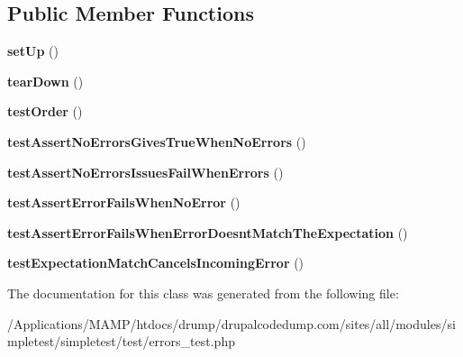 \subsection*{Public Member Functions}
\begin{DoxyCompactItemize}
\item 
\hypertarget{class_test_of_error_queue_a1073dde3733bd1c213b1581d3fb9f7b5}{
{\bfseries setUp} ()}
\label{class_test_of_error_queue_a1073dde3733bd1c213b1581d3fb9f7b5}

\item 
\hypertarget{class_test_of_error_queue_a047b4bffa4431c64edc4797cf8572d31}{
{\bfseries tearDown} ()}
\label{class_test_of_error_queue_a047b4bffa4431c64edc4797cf8572d31}

\item 
\hypertarget{class_test_of_error_queue_a553122da5234bb5e87b1db065303723a}{
{\bfseries testOrder} ()}
\label{class_test_of_error_queue_a553122da5234bb5e87b1db065303723a}

\item 
\hypertarget{class_test_of_error_queue_a516bd676dc9d5a3504d67329d5067984}{
{\bfseries testAssertNoErrorsGivesTrueWhenNoErrors} ()}
\label{class_test_of_error_queue_a516bd676dc9d5a3504d67329d5067984}

\item 
\hypertarget{class_test_of_error_queue_affe09d2b1a810a1d0c3c385c63d9ecec}{
{\bfseries testAssertNoErrorsIssuesFailWhenErrors} ()}
\label{class_test_of_error_queue_affe09d2b1a810a1d0c3c385c63d9ecec}

\item 
\hypertarget{class_test_of_error_queue_acecd7de41777fb566aea2d0f47caca7b}{
{\bfseries testAssertErrorFailsWhenNoError} ()}
\label{class_test_of_error_queue_acecd7de41777fb566aea2d0f47caca7b}

\item 
\hypertarget{class_test_of_error_queue_aef1f13dd3d822727256fdc92b48445b6}{
{\bfseries testAssertErrorFailsWhenErrorDoesntMatchTheExpectation} ()}
\label{class_test_of_error_queue_aef1f13dd3d822727256fdc92b48445b6}

\item 
\hypertarget{class_test_of_error_queue_abc6be0bda2007d14fe10f313bf27285f}{
{\bfseries testExpectationMatchCancelsIncomingError} ()}
\label{class_test_of_error_queue_abc6be0bda2007d14fe10f313bf27285f}

\end{DoxyCompactItemize}


The documentation for this class was generated from the following file:\begin{DoxyCompactItemize}
\item 
/Applications/MAMP/htdocs/drump/drupalcodedump.com/sites/all/modules/simpletest/simpletest/test/errors\_\-test.php\end{DoxyCompactItemize}
